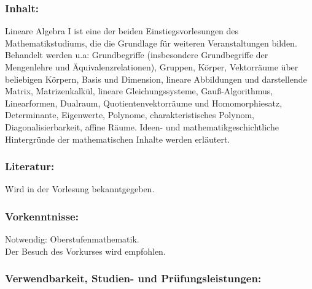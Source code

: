 \documentclass[a4paper,10pt]{article}
\begin{document}
\subsubsection*{\large
    Inhalt:
}
Lineare Algebra I ist eine der beiden Einstiegsvorlesungen des Mathematikstudiums, die die Grundlage für weiteren Veranstaltungen bilden. Behandelt werden u.a: Grundbegriffe (insbesondere Grundbegriffe der Mengenlehre und Äquivalenzrelationen), Gruppen, Körper, Vektorräume über beliebigen Körpern, Basis und Dimension, lineare Abbildungen und darstellende Matrix, Matrizenkalkül, lineare Gleichungssysteme, Gauß-Algorithmus, Linearformen, Dualraum, Quotientenvektorräume und Homomorphiesatz, Determinante, Eigenwerte, Polynome, charakteristisches Polynom, Diagonalisierbarkeit, affine Räume. Ideen- und mathematikgeschichtliche Hintergründe der mathematischen Inhalte werden erläutert.
\subsubsection*{\large
    Literatur:
}
Wird in der Vorlesung bekanntgegeben.
\subsubsection*{\large
    Vorkenntnisse:
}
Notwendig:  Oberstufenmathematik.  \\
Der Besuch des Vorkurses wird empfohlen.
\cleardoublepage
\subsubsection*{\large
    Verwendbarkeit, Studien- und Prüfungsleistungen:
}
\end{document}
